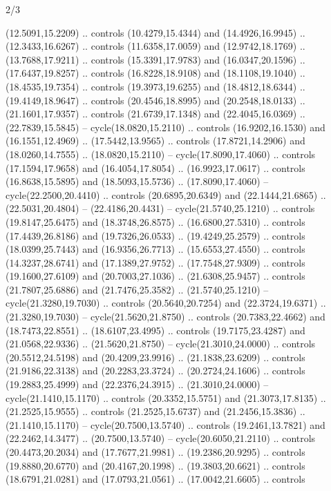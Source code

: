 \begin{flagdescription}{2/3}
\begin{scope}[yshift=\flagwidth,scale=\flagwidth/1241.93737]
\begin{scope}[y=-1mm, x=1mm,draw=gold,fill=blue,line join=miter,miter limit=4,line width=1.8\lw]
\begin{scope}[y=1mm, x=1mm, yscale=-1,shift={(573.68mm+\str,145.75)}]
\begin{scope}[scale=1.35,shift={(-9,-3)}]
\begin{scope}[scale=0.55]
\begin{scope}[scale=1.333]
    (12.5091,15.2209) .. controls (10.4279,15.4344) and (14.4926,16.9945) ..
    (12.3433,16.6267) .. controls (11.6358,17.0059) and (12.9742,18.1769) ..
    (13.7688,17.9211) .. controls (15.3391,17.9783) and (16.0347,20.1596) ..
    (17.6437,19.8257) .. controls (16.8228,18.9108) and (18.1108,19.1040) ..
    (18.4535,19.7354) .. controls (19.3973,19.6255) and (18.4812,18.6344) ..
    (19.4149,18.9647) .. controls (20.4546,18.8995) and (20.2548,18.0133) ..
    (21.1601,17.9357) .. controls (21.6739,17.1348) and (22.4045,16.0369) ..
    (22.7839,15.5845) -- cycle(18.0820,15.2110) .. controls (16.9202,16.1530) and
    (16.1551,12.4969) .. (17.5442,13.9565) .. controls (17.8721,14.2906) and
    (18.0260,14.7555) .. (18.0820,15.2110) -- cycle(17.8090,17.4060) .. controls
    (17.1594,17.9658) and (16.4054,17.8054) .. (16.9923,17.0617) .. controls
    (16.8638,15.5895) and (18.5093,15.5736) .. (17.8090,17.4060) --
    cycle(22.2500,20.4410) .. controls (20.6895,20.6349) and (22.1444,21.6865) ..
    (22.5031,20.4804) -- (22.4186,20.4431) -- cycle(21.5740,25.1210) .. controls
    (19.8147,25.6475) and (18.3748,26.8575) .. (16.6800,27.5310) .. controls
    (17.4439,26.8186) and (19.7326,26.0533) .. (19.4249,25.2579) .. controls
    (18.0399,25.7443) and (16.9356,26.7713) .. (15.6553,27.4550) .. controls
    (14.3237,28.6741) and (17.1389,27.9752) .. (17.7548,27.9309) .. controls
    (19.1600,27.6109) and (20.7003,27.1036) .. (21.6308,25.9457) .. controls
    (21.7807,25.6886) and (21.7476,25.3582) .. (21.5740,25.1210) --
    cycle(21.3280,19.7030) .. controls (20.5640,20.7254) and (22.3724,19.6371) ..
    (21.3280,19.7030) -- cycle(21.5620,21.8750) .. controls (20.7383,22.4662) and
    (18.7473,22.8551) .. (18.6107,23.4995) .. controls (19.7175,23.4287) and
    (21.0568,22.9336) .. (21.5620,21.8750) -- cycle(21.3010,24.0000) .. controls
    (20.5512,24.5198) and (20.4209,23.9916) .. (21.1838,23.6209) .. controls
    (21.9186,22.3138) and (20.2283,23.3724) .. (20.2724,24.1606) .. controls
    (19.2883,25.4999) and (22.2376,24.3915) .. (21.3010,24.0000) --
    cycle(21.1410,15.1170) .. controls (20.3352,15.5751) and (21.3073,17.8135) ..
    (21.2525,15.9555) .. controls (21.2525,15.6737) and (21.2456,15.3836) ..
    (21.1410,15.1170) -- cycle(20.7500,13.5740) .. controls (19.2461,13.7821) and
    (22.2462,14.3477) .. (20.7500,13.5740) -- cycle(20.6050,21.2110) .. controls
    (20.4473,20.2034) and (17.7677,21.9981) .. (19.2386,20.9295) .. controls
    (19.8880,20.6770) and (20.4167,20.1998) .. (19.3803,20.6621) .. controls
    (18.6791,21.0281) and (17.0793,21.0561) .. (17.0042,21.6605) .. controls

\end{scope}
\end{scope}
\end{scope}
\end{scope}
\end{scope}
\end{scope}
\end{flagdescription}
